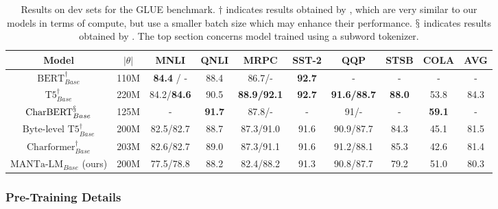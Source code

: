 \begin{table}[t]
\centering\small
\begin{tabular}{cccccccccc}
\toprule
Model                                   & $|\theta|$ & MNLI      & QNLI & MRPC      & SST-2 & QQP       & STSB & COLA & AVG  \\ \midrule
$\text{BERT}_{Base}^\dagger$            & 110M       & \textbf{84.4} / -  & 88.4 & 86.7/-    & \textbf{92.7}  & -         & -    & -    & -    \\[3pt]
$\text{T5}_{Base}^\dagger$              & 220M       & 84.2/\textbf{84.6} & 90.5 & \textbf{88.9/92.1} & \textbf{92.7} & \textbf{91.6/88.7} & \textbf{88.0} & 53.8 & 84.3 \\ \midrule
$\text{CharBERT}_{Base}^\mathsection$   & 125M       & -         & \textbf{91.7} & 87.8/-    & -     & 91/-      & -    & \textbf{59.1} & -    \\[3pt]
$\text{Byte-level T5}_{Base}^\dagger$   & 200M       & 82.5/82.7 & 88.7 & 87.3/91.0 & 91.6  & 90.9/87.7 & 84.3 & 45.1 & 81.5 \\[3pt]
$\text{Charformer}_{Base}^\dagger$      & 203M       & 82.6/82.7 & 89.0 & 87.3/91.1 & 91.6  & 91.2/88.1 & 85.3 & 42.6 & 81.4 \\[3pt]
$\text{MANTa-LM}_{Base}$ (ours)     & 200M        & 77.5/78.8 & 88.2 & 82.4/88.2 & 91.3  & 90.8/87.7 & 79.2 & 51.0 & 80.3\\ [3pt] \bottomrule
\end{tabular}
\caption{Results on dev sets for the GLUE benchmark. $\dagger$ indicates results obtained by \citet{tay2021charformer}, which are very similar to our models in terms of compute, but use a smaller batch size which may enhance their performance. $\mathsection$ indicates results obtained by \citet{ma-etal-2020-charbert}. The top section concerns model trained using a subword tokenizer.}
\label{tab:glue}
\end{table}

\subsubsection{Pre-Training Details}

